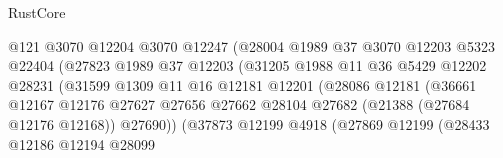 \begin{lexlean}{RustCore}
\begin{coremodule}
                                      @121
                                      @3070
                                      @12204
                                      @3070
                                      @12247
                                      (@28004
                                        @1989
                                        @37
                                        @3070
                                        @12203
                                        @5323
                                        @22404
                                        (@27823
                                          @1989
                                          @37
                                          @12203
                                          (@31205
                                            @1988
                                            @11
                                            @36
                                            @5429
                                            @12202
                                            @28231
                                            (@31599
                                              @1309
                                              @11
                                              @16
                                              @12181
                                              @12201
                                              (@28086
                                                @12181
                                                (@36661
                                                  @12167
                                                  @12176
                                                  @27627
                                                  @27656
                                                  @27662
                                                  @28104
                                                  @27682
                                                  (@21388 (@27684 @12176 @12168))
                                                  @27690))
                                              (@37873
                                                @12199
                                                @4918
                                                (@27869
                                                  @12199
                                                  (@28433
                                                    @12186
                                                    @12194
                                                    @28099

\end{coremodule}
\end{lexlean}
